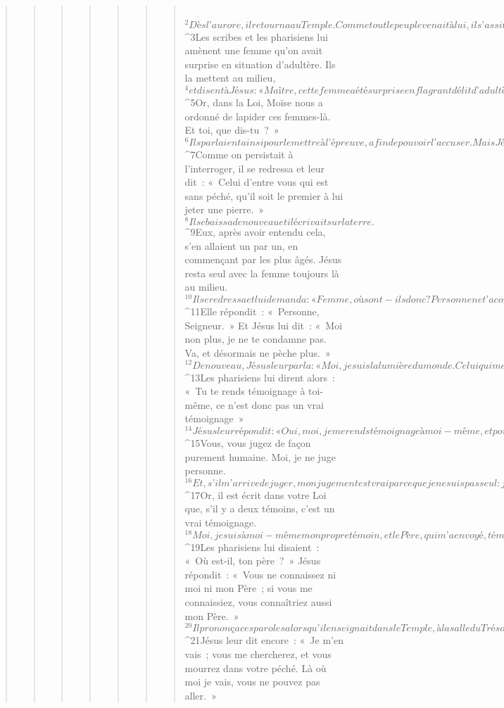 \begin{verse}
\begin{verse}
\begin{verse}
\begin{verse}
\begin{verse}
\begin{verse}
\begin{verse}
         
${}^{2}Dès l’aurore, il retourna au Temple. Comme tout le peuple venait à lui, il s’assit et se mit à enseigner. 
${}^{3}Les scribes et les pharisiens lui amènent une femme qu’on avait surprise en situation d’adultère. Ils la mettent au milieu, 
${}^{4}et disent à Jésus : « Maître, cette femme a été surprise en flagrant délit d’adultère. 
${}^{5}Or, dans la Loi, Moïse nous a ordonné de lapider ces femmes-là. Et toi, que dis-tu ? » 
${}^{6}Ils parlaient ainsi pour le mettre à l’épreuve, afin de pouvoir l’accuser. Mais Jésus s’était baissé et, du doigt, il écrivait sur la terre. 
${}^{7}Comme on persistait à l’interroger, il se redressa et leur dit : « Celui d’entre vous qui est sans péché, qu’il soit le premier à lui jeter une pierre. » 
${}^{8}Il se baissa de nouveau et il écrivait sur la terre. 
${}^{9}Eux, après avoir entendu cela, s’en allaient un par un, en commençant par les plus âgés. Jésus resta seul avec la femme toujours là au milieu. 
${}^{10}Il se redressa et lui demanda : « Femme, où sont-ils donc ? Personne ne t’a condamnée ? » 
${}^{11}Elle répondit : « Personne, Seigneur. » Et Jésus lui dit : « Moi non plus, je ne te condamne pas. Va, et désormais ne pèche plus. »
${}^{12}De nouveau, Jésus leur parla : « Moi, je suis la lumière du monde. Celui qui me suit ne marchera pas dans les ténèbres, il aura la lumière de la vie. » 
${}^{13}Les pharisiens lui dirent alors : « Tu te rends témoignage à toi-même, ce n’est donc pas un vrai témoignage » 
${}^{14}Jésus leur répondit : « Oui, moi, je me rends témoignage à moi-même, et pourtant mon témoignage est vrai, car je sais d’où je suis venu, et où je vais ; mais vous, vous ne savez ni d’où je viens, ni où je vais. 
${}^{15}Vous, vous jugez de façon purement humaine. Moi, je ne juge personne. 
${}^{16}Et, s’il m’arrive de juger, mon jugement est vrai parce que je ne suis pas seul : j’ai avec moi le Père, qui m’a envoyé. 
${}^{17}Or, il est écrit dans votre Loi que, s’il y a deux témoins, c’est un vrai témoignage. 
${}^{18}Moi, je suis à moi-même mon propre témoin, et le Père, qui m’a envoyé, témoigne aussi pour moi. » 
${}^{19}Les pharisiens lui disaient : « Où est-il, ton père ? » Jésus répondit : « Vous ne connaissez ni moi ni mon Père ; si vous me connaissiez, vous connaîtriez aussi mon Père. » 
${}^{20}Il prononça ces paroles alors qu’il enseignait dans le Temple, à la salle du Trésor. Et personne ne l’arrêta, parce que son heure n’était pas encore venue.
${}^{21}Jésus leur dit encore : « Je m’en vais ; vous me chercherez, et vous mourrez dans votre péché. Là où moi je vais, vous ne pouvez pas aller. » 

\end{verse}
\end{verse}
\end{verse}
\end{verse}
\end{verse}
\end{verse}
\end{verse}
